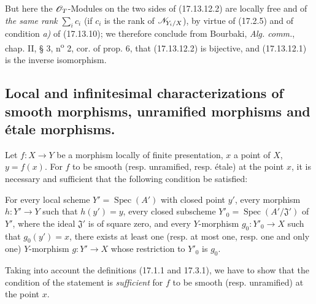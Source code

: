 
But here the $\mathscr{O}_T$-Modules on the two sides of (17.13.12.2) are locally free and of \emph{the same rank} $\sum_i c_i$ (if $c_i$ is the rank of $\mathscr{N}_{Y_i/X}$), by virtue of (17.2.5) and of condition \emph{a)} of (17.13.10); we therefore conclude from Bourbaki, \emph{Alg. comm.}, chap. II, § 3, n\textsuperscript{o} 2, cor. of prop. 6, that (17.13.12.2) is bijective, and (17.13.12.1) is the inverse isomorphism.

\subsection{Local and infinitesimal characterizations of smooth morphisms, unramified morphisms and étale morphisms.}

\begin{proposition}[17.14.1]
\label{IV.17.14.1}
Let $f:X\to Y$ be a morphism locally of finite presentation, $x$ a point of $X$, $y=f(x)$. For $f$ to be smooth \textup{(resp.} unramified, \textup{resp.} étale\textup{)} at the point $x$, it is necessary and sufficient that the following condition be satisfied:

For every \textup{local scheme} $Y'=\operatorname{Spec}(A')$ with closed point $y'$, every morphism $h:Y'\to Y$ such that $h(y')=y$, every closed subscheme $Y'_0=\operatorname{Spec}(A'/\mathfrak{J}')$ of $Y'$, where the ideal $\mathfrak{J}'$ is of square zero, and every $Y$-morphism $g_0:Y'_0\to X$ such that $g_0(y')=x$, there exists at least one \textup{(resp.} at most one, \textup{resp.} one and only one\textup{)} $Y$-morphism $g:Y'\to X$ whose restriction to $Y'_0$ is $g_0$.
\end{proposition}

Taking into account the definitions (17.1.1 and 17.3.1), we have to show that the condition of the statement is \emph{sufficient} for $f$ to be smooth (resp. unramified) at the point $x$.

